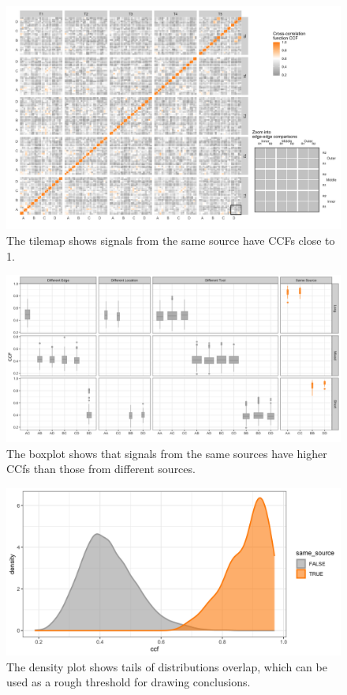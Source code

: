 \documentclass[fleqn,10pt]{wlscirep}
\begin{document}
\begin{figure}[ht]
\centering
\includegraphics[width=0.8\linewidth]{ccf_tilemap.png}
\caption{The tilemap shows signals from the same source have CCFs close to 1.}
\label{fig-ccf-tilemap}
\end{figure}

\begin{figure}[ht]
\centering
\includegraphics[width=0.8\linewidth]{ccf_boxplot.png}
\caption{The boxplot shows that signals from the same sources have higher CCfs than those from different sources.}
\label{fig-ccf-boxplot}
\end{figure}

\begin{figure}[ht]
\centering
\includegraphics[width=0.8\linewidth]{ccf_density.png}
\caption{The density plot shows tails of distributions overlap, which can be used as a rough threshold for drawing conclusions.}
\label{fig-ccf-density}
\end{figure}
\end{document}
